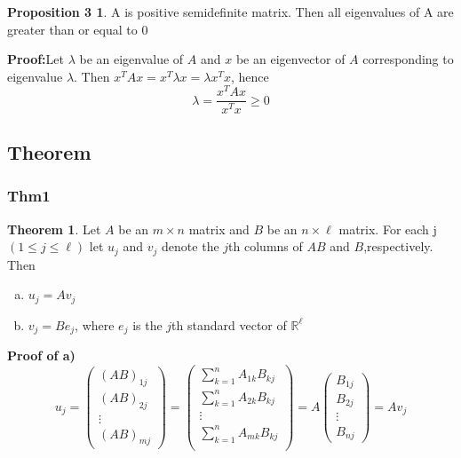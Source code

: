 \documentclass[12pt]{article}
\theoremstyle{definition}
\newtheorem*{prop3}{Proposition 3}
\newtheorem{thm1}{Theorem}
\begin{document}
\begin{prop3}
    A is positive semidefinite matrix. Then all eigenvalues of A are greater than or equal to 0
\end{prop3}

\textbf{Proof:}\quad Let $\lambda$ be an eigenvalue of $A$ and $x$ be an eigenvector of $A$ corresponding to eigenvalue $\lambda$. Then $x^TAx=x^T\lambda x=\lambda x^Tx$, hence 
\[\lambda=\frac{x^TAx}{x^Tx} \geq 0\]

\subsection{Theorem}

\subsubsection{Thm1}
\begin{thm1}\label{1.}
    Let $A$ be an $m\times n$ matrix and $B$ be an $n\times \ell$ matrix.
    For each j $(1\leq j\leq \ell)$
    let $u_j$ and $v_j$ denote the $j$th columns of $AB$ and $B$,respectively. Then
    \begin{enumerate}[a.)]
        \item $u_j=Av_j$
        \item $v_j=Be_j$, where $e_j$ is the $j$th standard vector of $\mathbb{R}^\ell$
    \end{enumerate}
\end{thm1}

\textbf{Proof of a)}
\[u_j=\begin{pmatrix}
        (AB)_{1j}\\
        (AB)_{2j}\\
        \vdots\\
        (AB)_{mj}
       \end{pmatrix}=
    \begin{pmatrix}
        \sum\limits_{k=1}^n{A_{1k}B_{kj}}\\
        \sum\limits_{k=1}^n{A_{2k}B_{kj}}\\
        \vdots\\
        \sum\limits_{k=1}^n{A_{mk}B_{kj}}\\
    \end{pmatrix}=A
    \begin{pmatrix}
        B_{1j}\\
        B_{2j}\\
        \vdots\\
        B_{nj}
    \end{pmatrix}=Av_j\]
\end{document}
